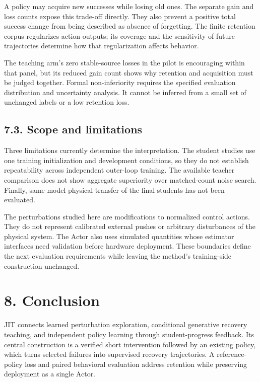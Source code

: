 \documentclass[
  american,
  11pt,
  a4paper,
]{article}
\begin{document}
A policy may acquire new successes while losing old ones. The separate
gain and loss counts expose this trade-off directly. They also prevent a
positive total success change from being described as absence of
forgetting. The finite retention corpus regularizes action outputs; its
coverage and the sensitivity of future trajectories determine how that
regularization affects behavior.

The teaching arm's zero stable-source losses in the pilot is encouraging
within that panel, but its reduced gain count shows why retention and
acquisition must be judged together. Formal non-inferiority requires the
specified evaluation distribution and uncertainty analysis. It cannot be
inferred from a small set of unchanged labels or a low retention loss.

\subsection{7.3. Scope and limitations}\label{scope-and-limitations}

Three limitations currently determine the interpretation. The student
studies use one training initialization and development conditions, so
they do not establish repeatability across independent outer-loop
training. The available teacher comparison does not show aggregate
superiority over matched-count noise search. Finally, same-model
physical transfer of the final students has not been evaluated.

The perturbations studied here are modifications to normalized control
actions. They do not represent calibrated external pushes or arbitrary
disturbances of the physical system. The Actor also uses simulated
quantities whose estimator interfaces need validation before hardware
deployment. These boundaries define the next evaluation requirements
while leaving the method's training-side construction unchanged.

\section{8. Conclusion}\label{conclusion}

JIT connects learned perturbation exploration, conditional generative
recovery teaching, and independent policy learning through
student-progress feedback. Its central construction is a verified short
intervention followed by an existing policy, which turns selected
failures into supervised recovery trajectories. A reference-policy loss
and paired behavioral evaluation address retention while preserving
deployment as a single Actor.
\end{document}
